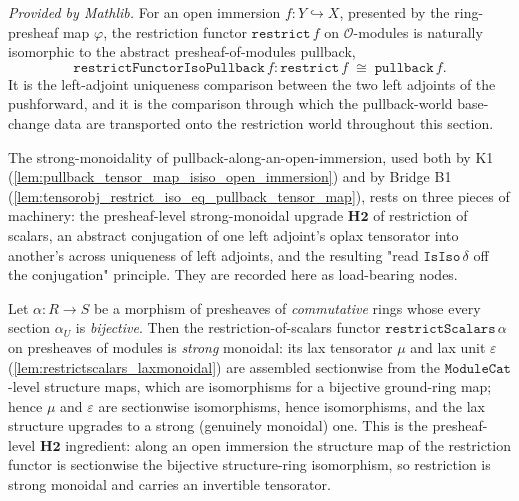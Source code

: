 \begin{definition}
  \label{def:restrictfunctorisopullback}
  \mathlibok
  \textit{Provided by Mathlib.}
  For an open immersion \(f : Y \hookrightarrow X\), presented by the ring-presheaf map
  \(\varphi\), the restriction functor \(\mathtt{restrict}\,f\) on \(\mathcal{O}\)-modules is
  naturally isomorphic to the abstract presheaf-of-modules pullback,
  \[
    \mathtt{restrictFunctorIsoPullback}\,f :
      \mathtt{restrict}\,f \;\cong\; \mathtt{pullback}\,f .
  \]
  It is the left-adjoint uniqueness comparison between the two left adjoints of the
  pushforward, and it is the comparison through which the pullback-world base-change data are
  transported onto the restriction world throughout this section.
\end{definition}

The strong-monoidality of pullback-along-an-open-immersion, used both by K1
(\cref{lem:pullback_tensor_map_isiso_open_immersion}) and by Bridge B1
(\cref{lem:tensorobj_restrict_iso_eq_pullback_tensor_map}), rests on three pieces of machinery: the
presheaf-level strong-monoidal upgrade \(\mathbf{H2}\) of restriction of scalars, an abstract
conjugation of one left adjoint's oplax tensorator into another's across uniqueness of left
adjoints, and the resulting "read \(\mathtt{IsIso}\,\delta\) off the conjugation" principle. They are
recorded here as load-bearing nodes.

\begin{lemma}
  \label{lem:restrictscalars_monoidal_of_bijective}
  Let \(\alpha : R \to S\) be a morphism of presheaves of \emph{commutative} rings whose every
  section \(\alpha_U\) is \emph{bijective}. Then the restriction-of-scalars functor
  \(\mathtt{restrictScalars}\,\alpha\) on presheaves of modules is \emph{strong} monoidal: its lax
  tensorator \(\mu\) and lax unit \(\varepsilon\) (\cref{lem:restrictscalars_laxmonoidal}) are
  assembled sectionwise from the \(\mathtt{ModuleCat}\)-level structure maps, which are isomorphisms
  for a bijective ground-ring map; hence \(\mu\) and \(\varepsilon\) are sectionwise isomorphisms,
  hence isomorphisms, and the lax structure upgrades to a strong (genuinely monoidal) one. This is
  the presheaf-level \(\mathbf{H2}\) ingredient: along an open immersion the structure map of the
  restriction functor is sectionwise the bijective structure-ring isomorphism, so restriction is
  strong monoidal and carries an invertible tensorator.
\end{lemma}

